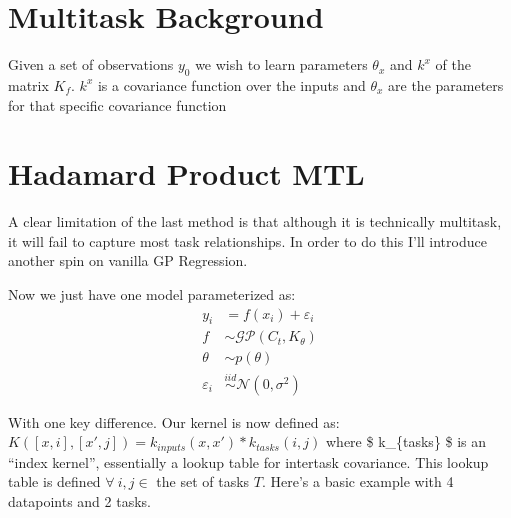 \documentclass[letterpaper,10pt,english,openany,oneside]{sphinxmanual}
\begin{document}
{\begin{sphinxVerbatim}[commandchars=\\\{\}]
   
      \PYG{p}{[}\PYG{p}{]}  \PYG{p}{[}\PYG{p}{]}\PYG{p}{[}\PYG{p}{]}\PYG{p}{[}\PYG{p}{]}    \PYG{p}{[}\PYG{p}{]}
     
\end{sphinxVerbatim}
}


\section{Multitask Background}
\label{\detokenize{Gaussian_Process_Walkthrough:Multitask-Background}}
Given a set of observations \(y_0\) we wish to learn parameters \(\theta_x\) and \(k^x\) of the matrix \(K_f\). \(k^x\) is a covariance function over the inputs and \(\theta_x\) are the parameters for that specific covariance function


\section{Hadamard Product MTL}
\label{\detokenize{Gaussian_Process_Walkthrough:Hadamard-Product-MTL}}
A clear limitation of the last method is that although it is technically multitask, it will fail to capture most task relationships. In order to do this I’ll introduce another spin on vanilla GP Regression.

Now we just have one model parameterized as: \begin{align*}
y_{i} &= f(x_i) + \varepsilon_{i} \\
f &\sim \mathcal{GP}(C_t,K_{\theta}) \\
\theta &\sim p(\theta) \\
\varepsilon_{i} &\stackrel{iid}{\sim} \mathcal{N}(0, \sigma^2)  \
\end{align*}

With one key difference. Our kernel is now defined as: \(K([x,i],[x',j]) = k_{inputs}(x,x') * k_{tasks}(i,j)\) where \$ k\_\{tasks\} \$ is an “index kernel”, essentially a lookup table for inter\sphinxhyphen{}task covariance. This lookup table is defined \(\forall \ i,j \in\) the set of tasks \(T\). Here’s a basic example with 4 datapoints and 2 tasks.
\end{document}

